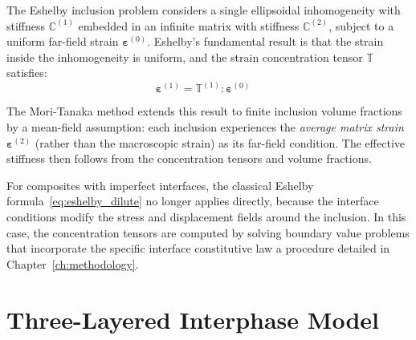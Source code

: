 \documentclass[oneside, 12pt, a4paper, bibliography=totoc]{book}
\newcommand{\bs}[1]{\bm{#1}}                       %
\begin{document}
The Eshelby inclusion problem \cite{Eshelby1957} considers a single ellipsoidal inhomogeneity with stiffness $\mathbb{C}^{(1)}$ embedded in an infinite matrix with stiffness $\mathbb{C}^{(2)}$, subject to a uniform far-field strain $\bs{\varepsilon}^{(0)}$. Eshelby's fundamental result is that the strain inside the inhomogeneity is uniform, and the  strain concentration tensor $\mathbb{T}$ satisfies:
%
\begin{equation}
    \bs{\varepsilon}^{(1)} = \mathbb{T}^{(1)} : \bs{\varepsilon}^{(0)} \quad
    \label{eq:eshelby_dilute}
\end{equation}
%

The Mori-Tanaka method \cite{Mori1973, Benveniste1987} extends this result to finite inclusion volume fractions by a mean-field assumption: each inclusion experiences the \textit{average matrix strain} $\bs{\varepsilon}^{(2)}$ (rather than the macroscopic strain) as its far-field condition. The effective stiffness then follows from the concentration tensors and volume fractions.

For composites with imperfect interfaces, the classical Eshelby formula~\eqref{eq:eshelby_dilute} no longer applies directly, because the interface conditions modify the stress and displacement fields around the inclusion. In this case, the concentration tensors are computed by solving boundary value problems that incorporate the specific interface constitutive law a procedure detailed in Chapter~\ref{ch:methodology}.

\section{Three-Layered Interphase Model}
\label{sec:interphase_model}
\end{document}
